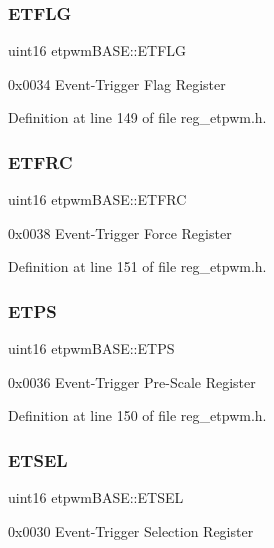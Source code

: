 \subsubsection{\texorpdfstring{E\+T\+F\+LG}{ETFLG}}
{\footnotesize\ttfamily uint16 etpwm\+B\+A\+S\+E\+::\+E\+T\+F\+LG}

0x0034 Event-\/\+Trigger Flag Register 

Definition at line 149 of file reg\+\_\+etpwm.\+h.

\mbox{\label{structetpwmBASE_a4aadb380e176d180e502fe7bfb4fbd0a}} 
\subsubsection{\texorpdfstring{E\+T\+F\+RC}{ETFRC}}
{\footnotesize\ttfamily uint16 etpwm\+B\+A\+S\+E\+::\+E\+T\+F\+RC}

0x0038 Event-\/\+Trigger Force Register 

Definition at line 151 of file reg\+\_\+etpwm.\+h.

\mbox{\label{structetpwmBASE_a34e748f1d3d8dfdb24e6fb00e88f9e75}} 
\subsubsection{\texorpdfstring{E\+T\+PS}{ETPS}}
{\footnotesize\ttfamily uint16 etpwm\+B\+A\+S\+E\+::\+E\+T\+PS}

0x0036 Event-\/\+Trigger Pre-\/\+Scale Register 

Definition at line 150 of file reg\+\_\+etpwm.\+h.

\mbox{\label{structetpwmBASE_a9957f3dd9a04e4367f602fcd79c201a6}} 
\subsubsection{\texorpdfstring{E\+T\+S\+EL}{ETSEL}}
{\footnotesize\ttfamily uint16 etpwm\+B\+A\+S\+E\+::\+E\+T\+S\+EL}

0x0030 Event-\/\+Trigger Selection Register 

